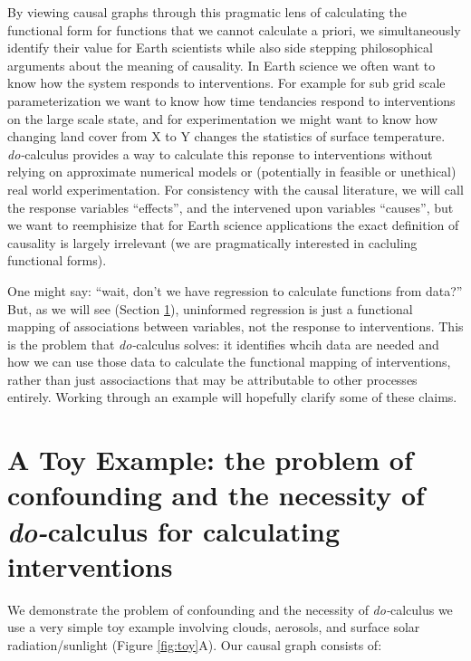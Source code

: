 \documentclass[12pt]{article}
\begin{document}
By viewing causal graphs through this pragmatic lens of calculating
the functional form for functions that we cannot calculate a priori,
we simultaneously identify their value for Earth scientists while also
side stepping philosophical arguments about the meaning of
causality. In Earth science we often want to know how the system
responds to interventions. For example for sub grid scale
parameterization we want to know how time tendancies respond to
interventions on the large scale state, and for experimentation we
might want to know how changing land cover from X to Y changes the
statistics of surface temperature. \textit{do-}calculus provides a way
to calculate this reponse to interventions without relying on
approximate numerical models or (potentially in feasible or unethical)
real world experimentation. For consistency with the causal
literature, we will call the response variables ``effects'', and the
intervened upon variables ``causes'', but we want to reemphisize that
for Earth science applications the exact definition of causality is
largely irrelevant (we are pragmatically interested in cacluling
functional forms).

One might say: ``wait, don't we have regression to calculate functions
from data?'' But, as we will see (Section
\ref{sec:causal-graphs-pearls}), uninformed regression is just a
functional mapping of associations between variables, not the response
to interventions. This is the problem that \textit{do-}calculus
solves: it identifies whcih data are needed and how we can use those
data to calculate the functional mapping of interventions, rather than
just associactions that may be attributable to other processes
entirely. Working through an example will hopefully clarify some of
these claims.

\section{A Toy Example: the problem of confounding and the necessity
  of \textit{do-}calculus for calculating interventions}
\label{sec:causal-graphs-pearls}

We demonstrate the problem of confounding and the necessity of
\textit{do-}calculus we use a very simple toy example involving
clouds, aerosols, and surface solar radiation/sunlight (Figure
\ref{fig:toy}A). Our causal graph consists of:
\end{document}
